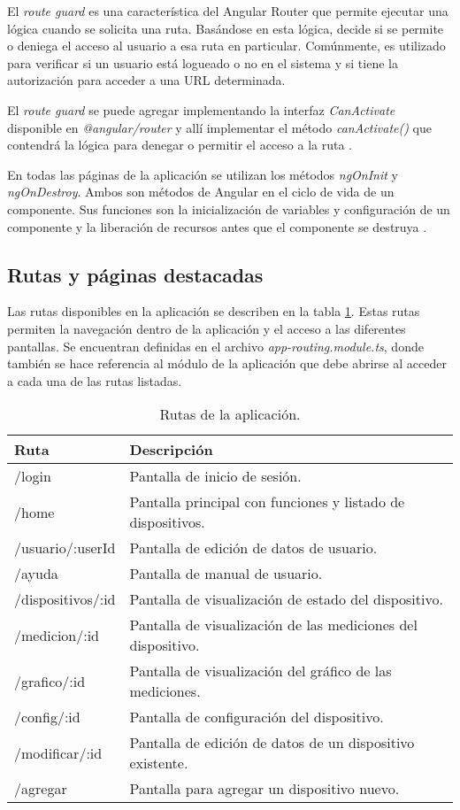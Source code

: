 El \textit{route guard} es una característica del Angular Router que permite ejecutar una lógica cuando se solicita una ruta. Basándose en esta lógica, decide si se permite o deniega el acceso al usuario a esa ruta en particular. Comúnmente, es utilizado para verificar si un usuario está logueado o no en el sistema y si tiene la autorización para acceder a una URL determinada.

El \textit{route guard} se puede agregar implementando la interfaz \textit{CanActivate} disponible en \textit{@angular/router} y allí implementar el método \textit{canActivate()} que contendrá la lógica para denegar o permitir el acceso a la ruta \citep{31}.

En todas las páginas de la aplicación se utilizan los métodos \textit{ngOnInit} y \textit{ngOnDestroy}. Ambos son métodos de Angular en el ciclo de vida de un componente. Sus funciones son la inicialización de variables y configuración de un componente y la liberación de recursos antes que el componente se destruya \citep{32}.

\subsection{Rutas y páginas destacadas}

Las rutas disponibles en la aplicación se describen en la tabla \ref{tab:rutas}. Estas rutas permiten la navegación dentro de la aplicación y el acceso a las diferentes pantallas. Se encuentran definidas en el archivo \textit{app-routing.module.ts}, donde también se hace referencia al módulo de la aplicación que debe abrirse al acceder a cada una de las rutas listadas.

\begin{table}[h]
\centering
\caption[Rutas de la aplicación]{Rutas de la aplicación.}
\begin{tabular}{l l}
\toprule
\textbf{Ruta} 			& \textbf{Descripción}\\
\midrule
/login					& Pantalla de inicio de sesión.\\
/home					& Pantalla principal con funciones y listado de dispositivos.\\
/usuario/:userId			& Pantalla de edición de datos de usuario.\\
/ayuda					& Pantalla de manual de usuario.\\
/dispositivos/:id		& Pantalla de visualización de estado del dispositivo.\\
/medicion/:id			& Pantalla de visualización de las mediciones del dispositivo.\\
/grafico/:id				& Pantalla de visualización del gráfico de las mediciones.\\
/config/:id				& Pantalla de configuración del dispositivo.\\
/modificar/:id			& Pantalla de edición de datos de un dispositivo existente.\\
/agregar					& Pantalla para agregar un dispositivo nuevo.\\
\bottomrule
\hline
\end{tabular}
\label{tab:rutas}
\end{table}

